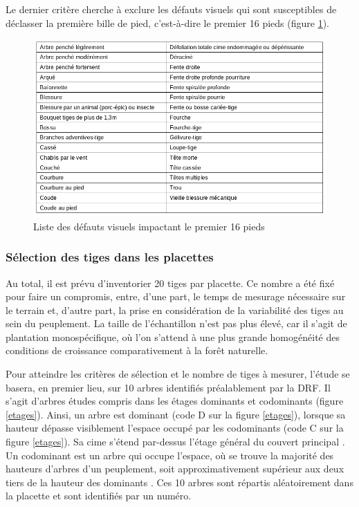 \documentclass[letterpaper, 12pt]{article}
\begin{document}
\begin{onehalfspace}
\begin{itemize}
\end{itemize}

\vspace{12pt}

Le dernier critère cherche à exclure les défauts visuels qui sont susceptibles de déclasser la première bille de pied, c'est-à-dire le premier 16 pieds (figure \ref{defaut}).  

\vspace{12pt}

\begin{figure}[H]
	\centering
	\includegraphics[width=15cm]{Defauts}
	\caption{Liste des défauts visuels impactant le premier 16 pieds}
	\label{defaut}
\end{figure}

\subsubsection{Sélection des tiges dans les placettes}
 
Au total, il est prévu d'inventorier 20 tiges par placette. Ce nombre a été fixé pour faire un compromis, entre, d'une part, le temps de mesurage nécessaire sur le terrain et, d'autre part, la prise en considération de la variabilité des tiges au sein du peuplement. La taille de l'échantillon n'est pas plus élevé, car il s'agit de plantation monospécifique, où l'on s'attend à une plus grande homogénéité des conditions de croissance comparativement à la forêt naturelle. 

\vspace{12pt}

Pour atteindre les critères de sélection et le nombre de tiges à mesurer, l'étude se basera, en premier lieu, sur 10 arbres identifiés préalablement par la DRF. Il s'agit d'arbres études compris dans les étages dominants et codominants (figure \ref{etages}). Ainsi, un arbre est dominant (code D sur la figure \ref{etages}), lorsque sa hauteur dépasse visiblement l'espace occupé par les codominants (code C sur la figure \ref{etages}). Sa  cime s’étend par-dessus l’étage général du couvert principal \cite{Methot2014}. Un codominant est un arbre qui occupe l'espace, où se trouve la majorité des hauteurs d'arbres d'un peuplement, soit approximativement supérieur aux deux tiers de la hauteur des dominants \cite{Methot2014}. Ces 10 arbres sont répartis aléatoirement dans la placette et sont identifiés par un numéro. 


\end{onehalfspace}
\end{document}
